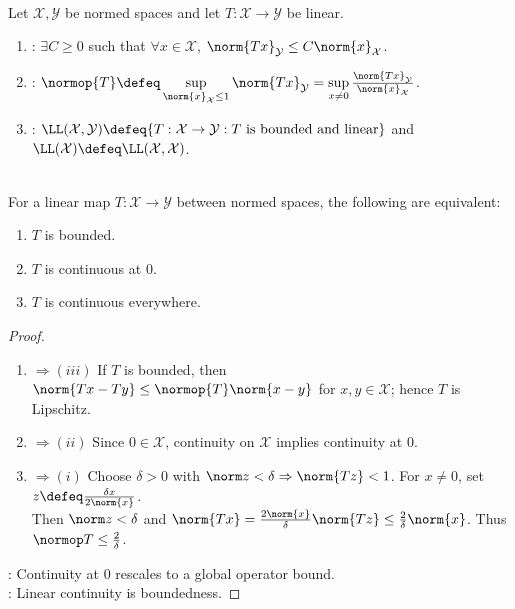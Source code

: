 \begin{definition} \label{def:bounded-linear-maps-and-operator-norm} \\
Let $\mathcal{X},\mathcal{Y}$ be normed spaces and let $T:\mathcal{X}\to\mathcal{Y}$ be linear.
\begin{enumerate}[label=(\roman*)]
\setlength{\itemsep}{0pt}
\item {}: $\exists C\geq0$ such that $\forall x\in\mathcal{X}$, $\norm{Tx}_{\mathcal{Y}}\leq C\norm{x}_{\mathcal{X}}$.
\item {}: $\normop{T}\defeq\sup\limits_{\norm{x}_{\mathcal{X}}\leq1}\norm{Tx}_{\mathcal{Y}}=\sup\limits_{x\neq0}\frac{\norm{Tx}_{\mathcal{Y}}}{\norm{x}_{\mathcal{X}}}$.
\item {}: $\LL(\mathcal{X},\mathcal{Y})\defeq\{T:\mathcal{X}\to\mathcal{Y}:T\text{ is bounded and linear}\}$ and $\LL(\mathcal{X})\defeq\LL(\mathcal{X},\mathcal{X})$.
\end{enumerate}
\end{definition}

\begin{theorem} \label{thm:bounded-linear-map-continuity-equivalences} \\
For a linear map $T:\mathcal{X}\to\mathcal{Y}$ between normed spaces, the following are equivalent:
\begin{enumerate}[label=(\roman*)]
\setlength{\itemsep}{0pt}
\item $T$ is bounded.
\item $T$ is continuous at $0$.
\item $T$ is continuous everywhere.
\end{enumerate}
\begin{proof}
\begin{enumerate}[label=(\roman*)]
\setlength{\itemsep}{0pt}
\item[$(i)$]$\Rightarrow (iii)$ If $T$ is bounded, then $\norm{Tx-Ty}\leq\normop{T}\norm{x-y}$ for $x,y\in\mathcal X$; hence $T$ is Lipschitz.
\item[$(iii)$]$\Rightarrow (ii)$ Since $0\in\mathcal X$, continuity on $\mathcal X$ implies continuity at $0$.
\item[$(ii)$]$\Rightarrow (i)$ Choose $\delta>0$ with $\norm z<\delta\Rightarrow\norm{Tz}<1$. For $x\ne0$, set $z\defeq\frac{\delta x}{2\norm{x}}$.\\
Then $\norm z<\delta$ and $\norm{Tx}=\frac{2\norm{x}}{\delta}\norm{Tz}\leq\frac{2}{\delta}\norm{x}$. Thus $\normop T\leq\frac{2}{\delta}$.
\end{enumerate}
: Continuity at $0$ rescales to a global operator bound.\\
: Linear continuity is boundedness.
\end{proof}
\end{theorem}

